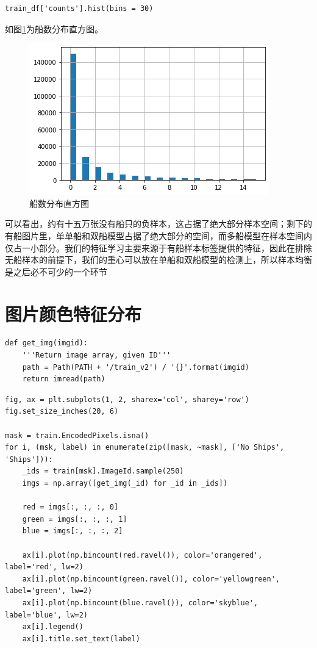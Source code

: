 \begin{lstlisting}
train_df['counts'].hist(bins = 30)
\end{lstlisting}

如图\ref{fig::EDA9}为船数分布直方图。

\begin{figure}[htbp]
\centering
\includegraphics[width=0.8\linewidth]{body/EDA_pic/EDA_19_1}
\caption{船数分布直方图}
\label{fig::EDA9}
\end{figure}

可以看出，约有十五万张没有船只的负样本，这占据了绝大部分样本空间；剩下的有船图片里，单单船和双船模型占据了绝大部分的空间，而多船模型在样本空间内仅占一小部分。我们的特征学习主要来源于有船样本标签提供的特征，因此在排除无船样本的前提下，我们的重心可以放在单船和双船模型的检测上，所以样本均衡是之后必不可少的一个环节

\section{图片颜色特征分布}\label{ux56feux7247ux989cux8272ux7279ux5f81ux5206ux5e03}

\begin{lstlisting}
def get_img(imgid):
    '''Return image array, given ID'''
    path = Path(PATH + '/train_v2') / '{}'.format(imgid)
    return imread(path)
\end{lstlisting}

\begin{lstlisting}
fig, ax = plt.subplots(1, 2, sharex='col', sharey='row')
fig.set_size_inches(20, 6)

mask = train.EncodedPixels.isna()
for i, (msk, label) in enumerate(zip([mask, ~mask], ['No Ships', 'Ships'])):
    _ids = train[msk].ImageId.sample(250)
    imgs = np.array([get_img(_id) for _id in _ids])
    
    red = imgs[:, :, :, 0]
    green = imgs[:, :, :, 1]
    blue = imgs[:, :, :, 2]
    
    ax[i].plot(np.bincount(red.ravel()), color='orangered', label='red', lw=2)
    ax[i].plot(np.bincount(green.ravel()), color='yellowgreen', label='green', lw=2)
    ax[i].plot(np.bincount(blue.ravel()), color='skyblue', label='blue', lw=2)
    ax[i].legend()
    ax[i].title.set_text(label)
\end{lstlisting}

